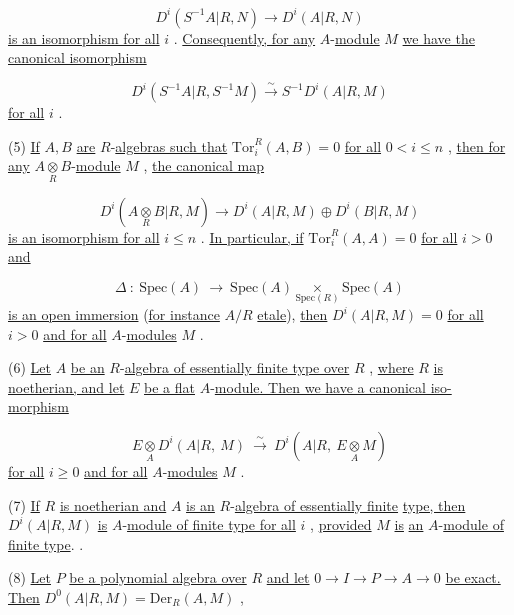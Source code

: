 $$D^i(S^{-1}A|R, N) \to D^i(A|R, N)$$
\underline{is an isomorphism for all}  $i$  . \underline{Consequently, for any} $A$-\underline{module}  $M$  \underline{we have the} \underline{canonical isomorphism}

$$D^i(S^{-1}A|R, S^{-1}M) \xrightarrow{\sim} S^{-1}D^i(A|R, M)$$
\underline{for all}  $i$  .

(5)  \underline{If}  $A, B$  \underline{are} $R$-\underline{algebras such that}  $\mathrm{Tor}_i^R(A, B) = 0$  \underline{for all} $0 < i \leq n$  , \underline{then for any}  $A\underset{R}{\otimes}B$-\underline{module}  $M$  , \underline{the canonical map}

$$D^i(A\underset{R}{\otimes}B|R, M) \to D^i(A|R, M) \oplus D^i(B|R, M)$$
\underline{is an isomorphism for all}  $i \leq n$  . \underline{In particular, if}  $\mathrm{Tor}_i^R(A, A) = 0$  \underline{for all}
$i > 0$  \underline{and}

\begin{equation*}
\Delta \ : \ \mathrm{Spec}(A) \ \to \ \mathrm{Spec}(A) \underset{\mathrm{Spec}(R)}{\times} \mathrm{Spec}(A)
\end{equation*}
\underline{is an open immersion} (\underline{for instance}  $A/R$  \underline{etale}), \underline{then}  $D^i(A|R, M) = 0$  \underline{for all} $i > 0$  \underline{and for all} $A$-\underline{modules}  $M$ .

(6) \underline{Let}  $A$  \underline{be an} $R$-\underline{algebra of essentially finite type over}  $R$ , \underline{where} $R$  \underline{is noetherian, and let}  $E$  \underline{be a flat} $A$-\underline{module. Then we have a canonical iso-}
\underline{morphism}

\begin{equation*}
E \underset{A}{\otimes} D^i(A|R, \ M) \ \overset{\sim}{\longrightarrow} \ D^i(A|R, \ E \underset{A}{\otimes} M)
\end{equation*}
\underline{for all}  $i \geq 0$  \underline{and for all} $A$-\underline{modules}  $M$ .

(7) \underline{If}  $R$  \underline{is noetherian and}  $A$  \underline{is an} $R$-\underline{algebra of essentially finite} \underline{type, then}  $D^i(A|R, M)$  \underline{is} $A$-\underline{module of finite type for all}  $i$ , \underline{provided}  $M$  \underline{is} \underline{an} $A$-\underline{module of finite type}.                                                                          .

(8) \underline{Let}  $P$  \underline{be a polynomial algebra over}  $R$  \underline{and let}  $0 \to I \to P \to A \to 0$ \underline{be exact. Then}  $D^0(A|R, M) = \mathrm{Der}_R(A, M)$  ,

